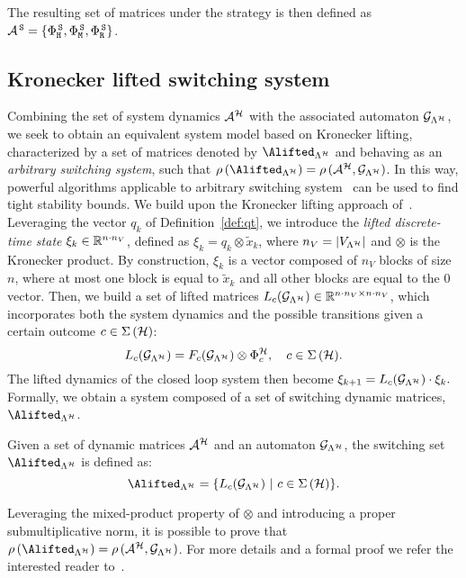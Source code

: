 %
The resulting set of matrices under the \tS{} strategy is then defined as $\mathcal{A}^{\,\texttt{S}}=\{\Phi{}^{\,\texttt{S}}_{\texttt{H}},\Phi{}^{\,\texttt{S}}_{\texttt{M}},\Phi{}^{\,\texttt{S}}_{\texttt{R}}\}$.


\subsection{Kronecker lifted switching system}%
\label{sec:system_dynamics}

Combining the set of system dynamics $\mathcal{A}^{\mathcal{H}}$ with the associated automaton $\mathcal{G}_{\Lambda^{\mathcal{H}}}$, we seek to obtain an equivalent system model based on Kronecker lifting, characterized by a set of matrices denoted by $\Alifted_{\Lambda^\strat}$ and behaving as an \emph{arbitrary switching system}, such that $\rho\,(\Alifted_{\Lambda^\strat})= \rho\,(\Aa^{\strat},\GG{\Lambda^\strat})$.
In this way, powerful algorithms applicable to arbitrary switching system~\cite{vankeerberghen2014jsr,sparsejsr} can be used to find tight stability bounds.
%
We build upon the Kronecker lifting approach of~\cite{xu2020approximation}.
Leveraging the vector $q_k$ of Definition~\ref{def:qt}, we introduce the \emph{lifted discrete-time state} $\xi_k \in \mathbb{R}^{n\cdot n_V}$, defined as $\xi_k = q_k\otimes \tilde{x}_k$, where $n_V = \left|V_{\Lambda^{\mathcal{H}}}\right|$ and $\otimes$ is the Kronecker product.
By construction, $\xi_k$ is a vector composed of $n_V$ blocks of size $n$, where at most one block is equal to $\tilde{x}_k$ and all other blocks are equal to the $0$ vector.
%
Then, we build a set of lifted matrices $L_{c} ( \mathcal{G}_{\Lambda^{\mathcal{H}}} ) \in \mathbb{R}^{n\cdot n_V\times n\cdot n_V}$, which incorporates both the system dynamics and the possible transitions given a certain outcome $c\in\Sigma\,(\mathcal{H})$:
%
\begin{equation}\label{eq:lifted_matrix}
    L_{c} ( \GG{\Lambda^\strat} ) = F_{c} ( \GG{\Lambda^\strat} )\otimes \clmat^\strat_c, \quad c \in \Sigma \,( \strat ).
\end{equation}
%
The lifted dynamics of the closed loop system then become $ \xi_{k+1} = L_{c} ( \mathcal{G}_{\Lambda^{\mathcal{H}}} )\cdot\xi_k.  $
Formally, we obtain a system composed of a set of switching dynamic matrices, $\Alifted_{\Lambda^\strat}$.
%
\begin{definition}%
    \label{def:switching_set}%
    Given a set of dynamic matrices $\mathcal{A}^{\mathcal{H}}$ and an automaton $\mathcal{G}_{\Lambda^{\mathcal{H}}}$, the switching set $\Alifted_{\Lambda^\strat}$ is defined as:
    $$
        \Alifted_{\Lambda^\strat} = \{ L_{c} ( \GG{\Lambda^\strat} ) \,\, | \,\, c \in \Sigma\,(\strat) \}.
    $$
\end{definition}%
%
Leveraging the mixed-product property of $\otimes$ and introducing a proper submultiplicative norm, it is possible to prove that $\rho\,(\Alifted_{\Lambda^\strat})= \rho\,(\Aa^{\strat},\GG{\Lambda^\strat})$.
For more details and a formal proof we refer the interested reader to~\cite{xu2020approximation}.

